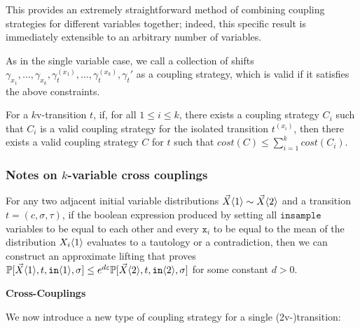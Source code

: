 This provides an extremely straightforward method of combining coupling strategies for different variables together; indeed, this specific result is immediately extensible to an arbitrary number of variables. 

As in the single variable case, we call a collection of shifts $\gamma_{x_1}, \ldots, \gamma_{x_k}, \gamma_t^{(x_1)}, \ldots, \gamma_t^{(x_k)}, \gamma_t'$ as a coupling strategy, which is valid if it satisfies the above constraints. 

\begin{cor}
    For a $k$v-transition $t$, if, for all $1\leq i\leq k$, there exists a coupling strategy $C_i$ such that $C_i$ is a valid coupling strategy for the isolated transition $t^{(x_i)}$, then there exists a valid coupling strategy $C$ for $t$ such that $cost(C)\leq \sum_{i=1}^k cost(C_i)$.
\end{cor}


\subsubsection{Notes on $k$-variable cross couplings}
\begin{lemma}
    For any two adjacent initial variable distributions $\vec{X}\langle1 \rangle\sim \vec{X}\langle2 \rangle$ and a transition $t = (c, \sigma, \tau)$, if the boolean expression produced by setting all $\texttt{insample}$ variables to be equal to each other and every $\texttt{x}_i$ to be equal to the mean of the distribution $X_i\langle1 \rangle$ evaluates to a tautology or a contradiction,
    then we can construct an approximate lifting that proves $\mathbb{P}[\vec{X}\langle1 \rangle, t, \texttt{in}\langle1 \rangle, \sigma]\leq e^{d\varepsilon}\mathbb{P}[\vec{X}\langle2 \rangle, t, \texttt{in}\langle2 \rangle, \sigma]$ for some constant $d>0$. 
\end{lemma}


\textbf{Cross-Couplings}

We now introduce a new type of coupling strategy for a single (2v-)transition:

